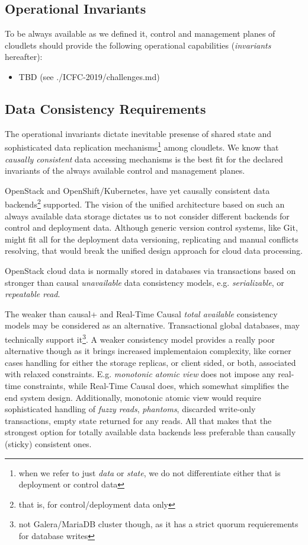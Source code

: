\documentclass[conference]{IEEEtran}
\begin{document}
\subsection{Operational Invariants}

To be always available as we defined it, control and management planes of
cloudlets should provide the following operational capabilities
(\textit{invariants} hereafter):

\begin{itemize}
  \item TBD (see ./ICFC-2019/challenges.md)
\end{itemize}

\subsection{Data Consistency Requirements}

The operational invariants dictate inevitable presense of shared state and
sophisticated data replication mechanisms\footnote{when we refer to just
\textit{data} or \textit{state}, we do not differentiate either that is
deployment or control data} among cloudlets. We know\cite{b4} that
\textit{causally consistent}\cite{b1}\cite{b2} data accessing mechanisms is
the best fit for the declared invariants of the always available control and
management planes.

OpenStack and OpenShift/Kubernetes, have yet causally consistent data
backends\footnote{that is, for control/deployment data only} supported. The
vision of the unified architecture based on such an always available data
storage dictates us to not consider different backends for control and
deployment data. Although generic version control systems, like Git, might fit
all for the deployment data versioning, replicating and manual conflicts
resolving, that would break the unified design approach for cloud data
processing.

OpenStack cloud data is normally stored in databases via transactions based on
stronger than causal \textit{unavailable}\cite{b4} data consistency models, e.g.
\textit{serializable}\cite{b4}, or \textit{repeatable read}\cite{b4}.

The weaker than causal+ and Real-Time Causal \textit{total available}\cite{b4}
consistency models may be considered as an alternative. Transactional global
databases\cite{b5}, may technically support it\footnote{not Galera/MariaDB
cluster though, as it has a strict quorum requierements for database writes}. A
weaker consistency model provides a really poor alternative though as it brings
increased implementaion complexity, like corner cases handling for either the
storage replicas, or client sided, or both, associated with relaxed
constraints. E.g. \textit{monotonic atomic view}\cite{b4} does not impose any
real-time constraints, while Real-Time Causal does, which somewhat simplifies
the end system design. Additionally, monotonic atomic view would require
sophisticated handling of \textit{fuzzy reads}\cite{b4},
\textit{phantoms}\cite{b4}, discarded write-only transactions, empty state
returned for any reads. All that makes that the strongest option for totally
available data backends less preferable than causally (sticky) consistent
ones.
\end{document}
